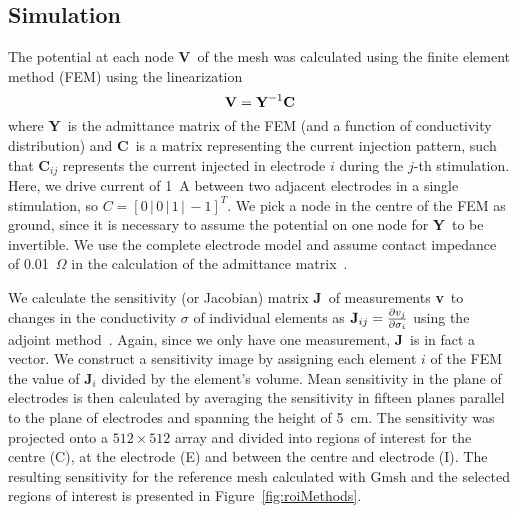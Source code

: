 \documentclass[12pt]{iopart}
\newcommand{\VB}{{\mbox{\bf V}}}
\newcommand{\YB}{{\mbox{\bf Y}}}
\newcommand{\CB}{{\mbox{\bf C}}}
\newcommand{\JB}{{\mbox{\bf J}}}
\newcommand{\vB}{{\mbox{\bf v}}}
\newcommand{\COMMENT}[1]{ \textsf{\color{blue}{{COMMENT: #1}}} }
\begin{document}
%
%
%

\subsection{Simulation}
The potential at each node \VB\ of the mesh was calculated using the finite
element method (FEM) using the linearization 
\begin{equation}
\VB = \YB^{-1}\CB
\end{equation}
where \YB\ is the admittance matrix of the FEM (and a function of conductivity
distribution) and \CB\ is a matrix representing the current injection pattern,
such that \CB$_{ij}$ represents the current injected in electrode $i$ during
the $j$-th stimulation. Here, we drive current of 1~A between two adjacent
electrodes in a single stimulation, so $C = [0\,|\,0\,|\,1\,|\,-1]^T$. 
We pick a node in the centre of the FEM as ground, since it is necessary to
assume the potential on
one node for \YB\ to be invertible.
We use the complete electrode model and assume contact impedance of
0.01~$\Omega$ in the calculation of the admittance
matrix~\parencite{polydorides_electrode_2002}. 


We calculate the sensitivity (or Jacobian) matrix \JB\ of measurements \vB\ to
changes in the conductivity $\sigma$ of individual elements as
$\JB_{ij}=\frac{\partial v_j}{\partial \sigma_i}$ using the adjoint
method~\parencite{polydorides_electrode_2002}. Again, since we only have one measurement, \JB\
is in fact a vector.
We construct a sensitivity image by assigning each element
$i$ of the FEM the value of \JB$_i$ divided by the element's volume.
Mean sensitivity in the plane of electrodes is then calculated by averaging
the sensitivity in fifteen planes parallel to the plane of electrodes and
spanning the height of 5~cm. 
The sensitivity was projected onto a $512\times512$ array and divided into regions
of interest for the centre (C), at the electrode (E) and between the centre and electrode
(I). The resulting sensitivity for the reference mesh calculated with Gmsh and the 
selected regions of interest is presented in Figure~\ref{fig:roiMethods}.
\end{document}
